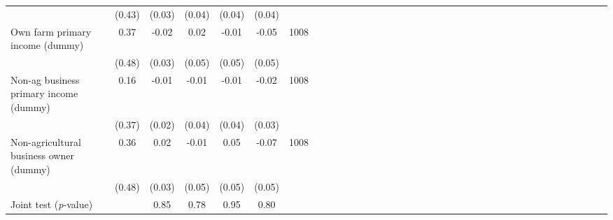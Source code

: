 {\begin{tabular}{l*{6}{SSSSSc}}
          &   (0.43)&   (0.03)&   (0.04)&   (0.04)&   (0.04)&         \\
Own farm primary income (dummy)&     0.37&    -0.02&     0.02&    -0.01&    -0.05&     1008\\
          &   (0.48)&   (0.03)&   (0.05)&   (0.05)&   (0.05)&         \\
Non-ag business primary income (dummy)&     0.16&    -0.01&    -0.01&    -0.01&    -0.02&     1008\\
          &   (0.37)&   (0.02)&   (0.04)&   (0.04)&   (0.03)&         \\
Non-agricultural business owner (dummy)&     0.36&     0.02&    -0.01&     0.05&    -0.07&     1008\\
          &   (0.48)&   (0.03)&   (0.05)&   (0.05)&   (0.05)&         \\
\midrule Joint test (\emph{p}-value)&         &     0.85&     0.78&     0.95&     0.80&         \\
\bottomrule
\end{tabular}
}
